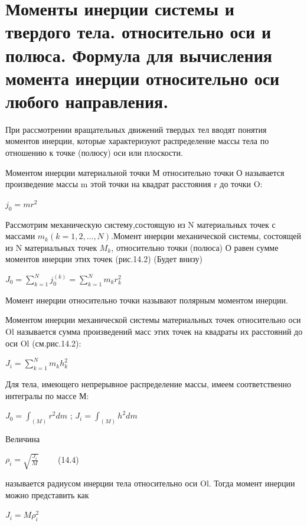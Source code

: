 {\section{Моменты инерции системы и твердого тела. относительно оси и полюса. Формула для вычисления момента инерции относительно оси любого направления.}
\begin{center}
    \par При рассмотрении вращательных движений твердых тел вводят понятия моментов инерции, которые характеризуют распределение массы тела по отношению к точке (полюсу) оси или плоскости.
    \par Моментом инерции материальной точки М относительно точки О называется произведение массы m этой точки на квадрат расстояния r до точки O: 
    \par ${j_0=mr^2}$
    \par Рассмотрим механическую систему,состоящую из N материальных точек с массами ${m_k} {(k=1,2,...,N)}$.Момент инерции механической системы, состоящей из N материальных точек $M_k$, относительно точки (полюса) О равен сумме моментов инерции этих точек (рис.14.2) (Будет внизу)
    \par ${J_0} = {{\sum_{k=1}^N {j_0^{(k)}}} ={\sum_{k=1}^N {m_k r_k^2}}} $
    \par Момент инерции относительно точки называют полярным моментом инерции.
    \par Моментом инерции механической системы материальных точек относительно оси Ol называется сумма произведений масс этих точек на квадраты их расстояний до оси Ol (см.рис.14.2):
    \par ${J_i}= {{\sum_{k=1}^N {m_k h_k^2}}} $
    \par Для тела, имеющего непрерывное распределение массы, имеем соответственно интегралы по массе М:
    \par $ J_0 = \int_{(M)} r^2dm$ ; $ J_i = \int_{(M)} h^2dm$
    \par Величина 
    \par $\rho_i = \sqrt{\frac{J_i}{M}} \qquad$ (14.4)
    \par называется радиусом инерции тела относительно оси Ol. Тогда момент инерции можно представить как 
    \par $ J_i = M \rho_i^2$
        \begin{figure}[H]

\end{figure}
\end{center}}
